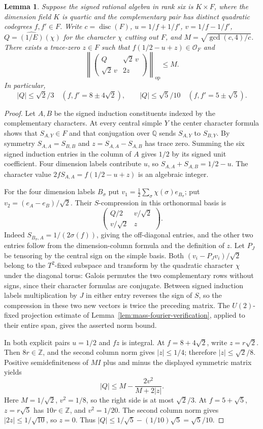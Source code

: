 \documentclass[11pt,reqno]{amsart}
\newtheorem{lemma}[theorem]{Lemma}
\theoremstyle{remark}\newtheorem{remark}[theorem]{Remark}
\numberwithin{equation}{section}
\begin{document}
\begin{lemma}\label{lem:quadratic-compression}
Suppose the signed rational algebra in rank six is $K\times F$,
where the dimension field $K$ is quartic and the complementary
pair has distinct quadratic codegrees $f,f'\in F$. Write
$c=\operatorname{disc}(F)$, $u=1/f+1/f'$, $v=1/f-1/f'$,
$Q=\widehat{(1/E)}(\chi)$ for the character $\chi$ cutting out $F$,
and $M=\sqrt{\gcd(c,4)/c}$. There exists a trace-zero $z\in F$
such that $f(1/2-u+z)\in\mathcal O_F$ and
\[
 \left\|\begin{pmatrix}Q&\sqrt2\,v\\
                 \sqrt2\,v&2z\end{pmatrix}\right\|_{\mathrm{op}}
                \le M.
\]
In particular,
\[
 |Q|\le\sqrt2/3\quad(f,f'=8\pm4\sqrt2),\qquad
 |Q|\le\sqrt5/10\quad(f,f'=5\pm\sqrt5).
\]
\end{lemma}
\begin{proof}
Let $A,B$ be the signed induction constituents indexed by the
complementary characters. At every central simple $Y$ the center
character formula shows that $S_{A,Y}\in F$ and that conjugation
over $\mathbb Q$ sends $S_{A,Y}$ to $S_{B,Y}$. By symmetry
$S_{A,A}=S_{B,B}$ and $z=S_{A,A}-S_{A,B}$ has trace zero.
Summing the six signed induction entries in the column of $A$
gives $1/2$ by its signed unit coefficient. Four dimension labels
contribute $u$, so $S_{A,A}+S_{A,B}=1/2-u$.
The character value $2f S_{A,A}=f(1/2-u+z)$ is an algebraic
integer.

For the four dimension labels $B_\sigma$ put
$v_1=\frac12\sum_\sigma\chi(\sigma)e_{B_\sigma}$;
put $v_2=(e_A-e_B)/\sqrt2$. Their $S$-compression in this
orthonormal basis is
\[
 \begin{pmatrix}Q/2&v/\sqrt2\\v/\sqrt2&z\end{pmatrix}.
\]
Indeed $S_{B_\sigma,A}=1/(2\sigma(f))$, giving the off-diagonal
entries, and the other two entries follow from the dimension-column
formula and the definition of $z$.
Let $P_J$ be tensoring by the central sign on the simple basis.
Both $(v_i-P_Jv_i)/\sqrt2$ belong to the $T^2$-fixed subspace and
transform by the quadratic character $\chi$ under the diagonal torus:
Galois permutes the two complementary rows without signs, since
their character formulas are conjugate. Between signed induction
labels multiplication by $J$ in either entry reverses the sign
of $S$, so the compression in these two new vectors is twice
the preceding matrix. The $U(2)$-fixed projection estimate of
Lemma~\ref{lem:mass-fourier-verification}, applied to their entire
span, gives the asserted norm bound.

In both explicit pairs $u=1/2$ and $fz$ is integral. At
$f=8+4\sqrt2$, write $z=r\sqrt2$. Then $8r\in\mathbb Z$,
and the second column norm gives $|z|\le1/4$; therefore
$|z|\le\sqrt2/8$. Positive semidefiniteness of $MI$ plus and
minus the displayed symmetric matrix yields
\[
 |Q|\le M-\frac{2v^2}{M+2|z|}.
\]
Here $M=1/\sqrt2$, $v^2=1/8$, so the right side is at most
$\sqrt2/3$. At $f=5+\sqrt5$, $z=r\sqrt5$ has $10r\in\mathbb Z$,
and $v^2=1/20$. The second column norm gives $|2z|\le1/\sqrt{10}$,
so $z=0$. Thus $|Q|\le1/\sqrt5-(1/10)\sqrt5=\sqrt5/10$.
\end{proof}
\end{document}
